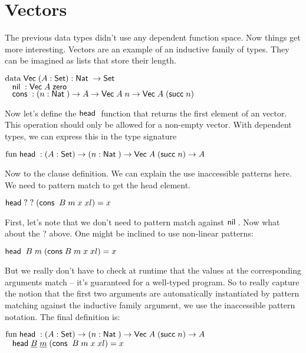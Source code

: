 \section{Vectors}
The previous data types didn't use any dependent function space. 
Now things get more interesting. Vectors are an example of an inductive family of types.
They can be imagined as lists that store their length.
\begin{bsp}
$\mathrm{data}\; \mathsf{Vec}\; ( A : \mathsf{Set} ) : \mathsf{Nat}\; \rightarrow \mathsf{Set} $ \\
$\hspace*{3mm} \mathsf{nil}\; : \mathsf{Vec}\; A \; \mathsf{zero}\;  $\\
$ \hspace*{3mm} \mathsf{cons}\; : ( n : \mathsf{Nat}\; ) \rightarrow{ A \rightarrow\mathsf{Vec}\;A \; n \rightarrow\mathsf{Vec}\;A \; (\mathsf{succ}\;n)} $
\end{bsp}
Now let's define the $\mathsf{head}\;$ function that returns the first element of an vector. This operation should only be allowed for a non-empty vector.
With dependent types, we can express this in the type signature
\begin{bsp}
$ \mathrm{fun}\; \mathsf{head}\; : ( A : \mathsf{Set} ) \rightarrow ( n : \mathsf{Nat}\; ) \rightarrow \mathsf{Vec}\; A \; (\mathsf{succ}\; n) \rightarrow A $
\end{bsp}
Now to the clause definition. We can explain the use inaccessible patterns here.
We need to pattern match to get the head element.
\begin{bsp}
$\mathsf{head}\; ? \; ? \; (\mathsf{cons}\; \; B \; m \; x \; xl) = x $
\end{bsp}
First, let's note that we don't need to pattern match against $\mathsf{nil}\;$.
Now what about the ? above. 
One might be inclined to use non-linear patterns:
\begin{bsp}
$\mathsf{head}\; \; B \; m \; (\mathsf{cons}\;  B \; m \; x \; xl) = x $
\end{bsp}
But we really don't have to check at runtime that the values at the corresponding arguments match -- it's guaranteed for a well-typed program.
So to really capture the notion that the first two arguments are automatically instantiated by pattern matching against the inductive family argument, we use the inaccessible pattern notation. The final definition is:
\begin{bsp}
$ \mathrm{fun}\; \mathsf{head}\; : ( A : \mathsf{Set} ) \rightarrow ( n : \mathsf{Nat}\; ) \rightarrow \mathsf{Vec}\; A \; (\mathsf{succ}\; n) \rightarrow A $\\
$ \hspace*{3mm} \mathsf{head}\; \underline{B} \; \underline{m} \; (\mathsf{cons}\; \; B \; m \; x \; xl) = x $
\end{bsp}
